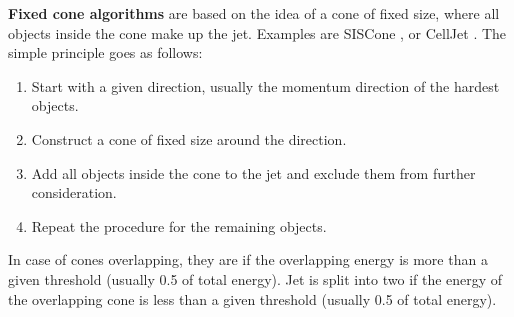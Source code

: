 \textbf{Fixed cone algorithms} are based on the idea of a cone of fixed size, where all objects inside the cone make up the jet.
Examples are SISCone \cite{siscone}, or CellJet \cite{pythia}.
The simple principle goes as follows:
\begin{enumerate}
    \item Start with a given direction, usually the momentum direction of the hardest objects.
    \item Construct a cone of fixed size around the direction.
    \item Add all objects inside the cone to the jet and exclude them from further consideration.
    \item Repeat the procedure for the remaining objects.
\end{enumerate}
In case of cones overlapping, they are  if the overlapping energy is more than a given threshold (usually 0.5 of total energy).
Jet is split into two if the energy of the overlapping cone is less than a given threshold (usually 0.5 of total energy).

